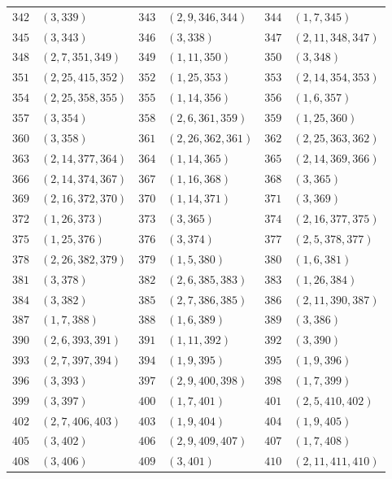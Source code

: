 {\begin{longtable}{@{}rl@{\qquad}rl@{\qquad}rl@{}}
\(342\)&\((3,339)\) & \(343\)&\((2,9,346,344)\) & \(344\)&\((1,7,345)\)\\
\(345\)&\((3,343)\) & \(346\)&\((3,338)\) & \(347\)&\((2,11,348,347)\)\\
\(348\)&\((2,7,351,349)\) & \(349\)&\((1,11,350)\) & \(350\)&\((3,348)\)\\
\(351\)&\((2,25,415,352)\) & \(352\)&\((1,25,353)\) & \(353\)&\((2,14,354,353)\)\\
\(354\)&\((2,25,358,355)\) & \(355\)&\((1,14,356)\) & \(356\)&\((1,6,357)\)\\
\(357\)&\((3,354)\) & \(358\)&\((2,6,361,359)\) & \(359\)&\((1,25,360)\)\\
\(360\)&\((3,358)\) & \(361\)&\((2,26,362,361)\) & \(362\)&\((2,25,363,362)\)\\
\(363\)&\((2,14,377,364)\) & \(364\)&\((1,14,365)\) & \(365\)&\((2,14,369,366)\)\\
\(366\)&\((2,14,374,367)\) & \(367\)&\((1,16,368)\) & \(368\)&\((3,365)\)\\
\(369\)&\((2,16,372,370)\) & \(370\)&\((1,14,371)\) & \(371\)&\((3,369)\)\\
\(372\)&\((1,26,373)\) & \(373\)&\((3,365)\) & \(374\)&\((2,16,377,375)\)\\
\(375\)&\((1,25,376)\) & \(376\)&\((3,374)\) & \(377\)&\((2,5,378,377)\)\\
\(378\)&\((2,26,382,379)\) & \(379\)&\((1,5,380)\) & \(380\)&\((1,6,381)\)\\
\(381\)&\((3,378)\) & \(382\)&\((2,6,385,383)\) & \(383\)&\((1,26,384)\)\\
\(384\)&\((3,382)\) & \(385\)&\((2,7,386,385)\) & \(386\)&\((2,11,390,387)\)\\
\(387\)&\((1,7,388)\) & \(388\)&\((1,6,389)\) & \(389\)&\((3,386)\)\\
\(390\)&\((2,6,393,391)\) & \(391\)&\((1,11,392)\) & \(392\)&\((3,390)\)\\
\(393\)&\((2,7,397,394)\) & \(394\)&\((1,9,395)\) & \(395\)&\((1,9,396)\)\\
\(396\)&\((3,393)\) & \(397\)&\((2,9,400,398)\) & \(398\)&\((1,7,399)\)\\
\(399\)&\((3,397)\) & \(400\)&\((1,7,401)\) & \(401\)&\((2,5,410,402)\)\\
\(402\)&\((2,7,406,403)\) & \(403\)&\((1,9,404)\) & \(404\)&\((1,9,405)\)\\
\(405\)&\((3,402)\) & \(406\)&\((2,9,409,407)\) & \(407\)&\((1,7,408)\)\\
\(408\)&\((3,406)\) & \(409\)&\((3,401)\) & \(410\)&\((2,11,411,410)\)\\

\end{longtable}}
